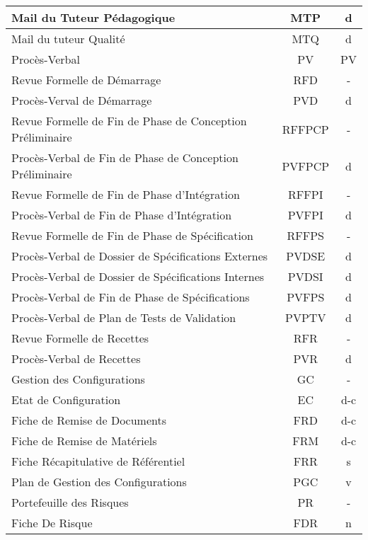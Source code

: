 \begin{table}[H]
\begin{tabularx}{18cm}{|X|c|c|}
    \hline
          Mail du Tuteur Pédagogique & MTP & d\\
    \hline
          Mail du tuteur Qualité & MTQ & d\\
    \hline
       Procès-Verbal & PV & PV\\
    \hline
          Revue Formelle de Démarrage & RFD & -\\
    \hline
             Procès-Verval de Démarrage & PVD & d\\
    \hline
          Revue Formelle de Fin de Phase de Conception Préliminaire & RFFPCP & -\\
    \hline
             Procès-Verbal de Fin de Phase de Conception Préliminaire & PVFPCP & d\\
    \hline
          Revue Formelle de Fin de Phase d'Intégration & RFFPI & -\\
    \hline
             Procès-Verbal de Fin de Phase d'Intégration & PVFPI & d\\
    \hline
          Revue Formelle de Fin de Phase de Spécification & RFFPS & -\\
    \hline
             Procès-Verbal de Dossier de Spécifications Externes & PVDSE & d\\
    \hline
             Procès-Verbal de Dossier de Spécifications Internes & PVDSI & d\\
    \hline
             Procès-Verbal de Fin de Phase de Spécifications & PVFPS & d\\
    \hline
             Procès-Verbal de Plan de Tests de Validation & PVPTV & d\\
    \hline
          Revue Formelle de Recettes & RFR & -\\
    \hline
             Procès-Verbal de Recettes & PVR & d\\
    \hline
    Gestion des Configurations & GC & -\\
    \hline
       Etat de Configuration & EC & d-c\\
    \hline
       Fiche de Remise de Documents & FRD & d-c\\
    \hline
       Fiche de Remise de Matériels & FRM & d-c\\
    \hline
       Fiche Récapitulative de Référentiel & FRR & s\\
    \hline
       Plan de Gestion des Configurations & PGC & v\\
    \hline
    Portefeuille des Risques & PR & -\\
    \hline
       Fiche De Risque & FDR & n\\

\end{tabularx}
\end{table}
